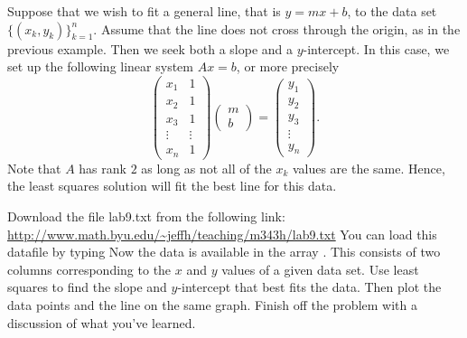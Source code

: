Suppose that we wish to fit a general line, that is $y=m x+b$, to the data set $\{(x_k,y_k)\}^n_{k=1}$.  Assume that the line does not cross through the origin, as in the previous example.  Then we seek both a slope and a $y$-intercept.  In this case, we set up the following linear system $A x = b$, or more precisely
\[
\begin{pmatrix}
x_1 & 1\\
x_2 & 1\\
x_3 & 1\\
\vdots & \vdots\\
x_n & 1
\end{pmatrix}
\begin{pmatrix}
m\\
b
\end{pmatrix}=
\begin{pmatrix}
y_1\\
y_2\\
y_3\\
\vdots\\
y_n
\end{pmatrix}.
\]
Note that $A$ has rank $2$ as long as not all of the $x_k$ values are the same.  Hence, the least squares solution will fit the best line for this data.


\begin{problem}
Download the file lab9.txt from the following link:
\url{http://www.math.byu.edu/~jeffh/teaching/m343h/lab9.txt}
You can load this datafile by typing
Now the data is available in the array .
This consists of two columns corresponding to the $x$ and $y$ values of a given data set.  Use least squares to find the slope and $y$-intercept that best fits the data.  Then plot the data points and the line on the same graph.  Finish off the problem with a discussion of what you've learned.
\end{problem}
